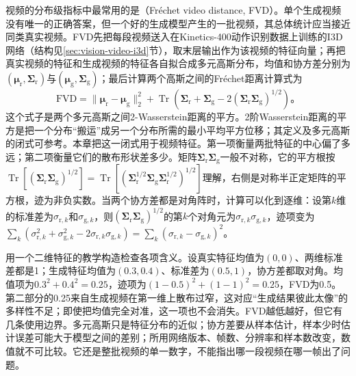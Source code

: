 视频的分布级指标中最常用的是（Fréchet video distance, FVD）。单个生成视频没有唯一的正确答案，但一个好的生成模型产生的一批视频，其总体统计应当接近同类真实视频。FVD先把每段视频送入在Kinetics-400动作识别数据上训练的I3D网络（结构见\ref{sec:vision-video-i3d}节），取末层输出作为该视频的特征向量；再把真实视频的特征和生成视频的特征各自拟合成多元高斯分布，均值和协方差分别为$(\bm\mu_{\mathrm r},\bm\Sigma_{\mathrm r})$与$(\bm\mu_{\mathrm g},\bm\Sigma_{\mathrm g})$；最后计算两个高斯之间的Fréchet距离计算式为
\begin{equation}
  \mathrm{FVD}
  =\lVert\bm\mu_{\mathrm r}-\bm\mu_{\mathrm g}\rVert_2^2
   +\operatorname{Tr}\!\left(
     \bm\Sigma_{\mathrm r}+\bm\Sigma_{\mathrm g}
     -2(\bm\Sigma_{\mathrm r}\bm\Sigma_{\mathrm g})^{1/2}
    \right)\text{。}
  \label{eq:vision-multigen-fvd}
\end{equation}
这个式子是两个多元高斯之间2-Wasserstein距离的平方。2阶Wasserstein距离的平方是把一个分布“搬运”成另一个分布所需的最小平均平方位移；其定义及多元高斯的闭式可参考。本章把这一闭式用于视频特征。第一项衡量两批特征的中心偏了多远；第二项衡量它们的散布形状差多少。矩阵$\bm\Sigma_{\mathrm r}\bm\Sigma_{\mathrm g}$一般不对称，它的平方根按$\operatorname{Tr}[(\bm\Sigma_{\mathrm r}\bm\Sigma_{\mathrm g})^{1/2}]=\operatorname{Tr}[(\bm\Sigma_{\mathrm r}^{1/2}\bm\Sigma_{\mathrm g}\bm\Sigma_{\mathrm r}^{1/2})^{1/2}]$理解，右侧是对称半正定矩阵的平方根，迹为非负实数。当两个协方差都是对角阵时，计算可以化到逐维：设第$k$维的标准差为$\sigma_{\mathrm r,k}$和$\sigma_{\mathrm g,k}$，则$(\bm\Sigma_{\mathrm r}\bm\Sigma_{\mathrm g})^{1/2}$的第$k$个对角元为$\sigma_{\mathrm r,k}\sigma_{\mathrm g,k}$，迹项变为$\sum_k(\sigma_{\mathrm r,k}^2+\sigma_{\mathrm g,k}^2-2\sigma_{\mathrm r,k}\sigma_{\mathrm g,k})=\sum_k(\sigma_{\mathrm r,k}-\sigma_{\mathrm g,k})^2$。

用一个二维特征的教学构造检查各项含义。设真实特征均值为$(0,0)$、两维标准差都是1；生成特征均值为$(0.3,0.4)$、标准差为$(0.5,1)$，协方差都取对角。均值项为$0.3^2+0.4^2=0.25$，迹项为$(1-0.5)^2+(1-1)^2=0.25$，FVD为0.5。第二部分的0.25来自生成视频在第一维上散布过窄，这对应“生成结果彼此太像”的多样性不足；即使把均值完全对准，这一项也不会消失。FVD越低越好，但它有几条使用边界。多元高斯只是特征分布的近似；协方差要从样本估计，样本少时估计误差可能大于模型之间的差别；所用网络版本、帧数、分辨率和样本数改变，数值就不可比较。它还是整批视频的单一数字，不能指出哪一段视频在哪一帧出了问题。


